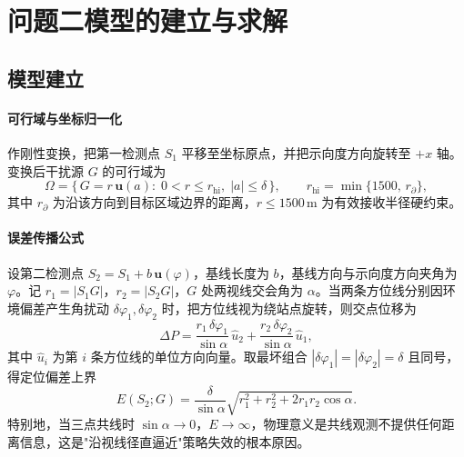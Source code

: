 \documentclass[12pt,a4paper]{ctexart}
\begin{document}
\section{问题二模型的建立与求解}
\label{sec:q2}

\subsection{模型建立}

\paragraph{可行域与坐标归一化}
作刚性变换，把第一检测点 $S_1$ 平移至坐标原点，并把示向度方向旋转至 $+x$ 轴。变换后干扰源 $G$ 的可行域为
\begin{equation}
  \Omega=\bigl\{\,G=r\,\bm{u}(a):\;0<r\le r_{\mathrm{hi}},\;|a|\le\delta\,\bigr\},
  \qquad r_{\mathrm{hi}}=\min\{1500,\,r_{\partial}\},
  \label{eq:omega}
\end{equation}
其中 $r_{\partial}$ 为沿该方向到目标区域边界的距离，$r\le1500\,\text{m}$ 为有效接收半径硬约束。

\paragraph{误差传播公式}
设第二检测点 $S_2=S_1+b\,\bm{u}(\varphi)$，基线长度为 $b$，基线方向与示向度方向夹角为 $\varphi$。记 $r_1=|S_1G|$，$r_2=|S_2G|$，$G$ 处两视线交会角为 $\alpha$。当两条方位线分别因环境偏差产生角扰动 $\delta\varphi_1,\delta\varphi_2$ 时，把方位线视为绕站点旋转，则交点位移为
\begin{equation}
  \Delta P=\frac{r_1\,\delta\varphi_1}{\sin\alpha}\,\hat{u}_2+\frac{r_2\,\delta\varphi_2}{\sin\alpha}\,\hat{u}_1,
  \label{eq:err-vec}
\end{equation}
其中 $\hat{u}_i$ 为第 $i$ 条方位线的单位方向向量。取最坏组合 $|\delta\varphi_1|=|\delta\varphi_2|=\delta$ 且同号，得定位偏差上界
\begin{equation}
  E(S_2;G)=\frac{\delta}{\sin\alpha}\sqrt{r_1^2+r_2^2+2r_1r_2\cos\alpha}.
  \label{eq:err-general}
\end{equation}
特别地，当三点共线时 $\sin\alpha\to0$，$E\to\infty$，物理意义是共线观测不提供任何距离信息，这是"沿视线径直逼近"策略失效的根本原因。
\end{document}
